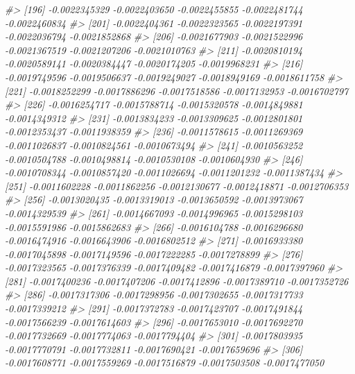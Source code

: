 \documentclass[
]{article}
\newenvironment{Shaded}{\begin{snugshade}}{\end{snugshade}}
\newcommand{\CommentTok}[1]{\textcolor[rgb]{0.56,0.35,0.01}{\textit{#1}}}
\begin{document}
\begin{Shaded}
\begin{Highlighting}[]
\CommentTok{\#\textgreater{} [196] {-}0.0022345329 {-}0.0022403650 {-}0.0022455855 {-}0.0022481744 {-}0.0022460834}
\CommentTok{\#\textgreater{} [201] {-}0.0022404361 {-}0.0022323565 {-}0.0022197391 {-}0.0022036794 {-}0.0021852868}
\CommentTok{\#\textgreater{} [206] {-}0.0021677903 {-}0.0021522996 {-}0.0021367519 {-}0.0021207206 {-}0.0021010763}
\CommentTok{\#\textgreater{} [211] {-}0.0020810194 {-}0.0020589141 {-}0.0020384447 {-}0.0020174205 {-}0.0019968231}
\CommentTok{\#\textgreater{} [216] {-}0.0019749596 {-}0.0019506637 {-}0.0019249027 {-}0.0018949169 {-}0.0018611758}
\CommentTok{\#\textgreater{} [221] {-}0.0018252299 {-}0.0017886296 {-}0.0017518586 {-}0.0017132953 {-}0.0016702797}
\CommentTok{\#\textgreater{} [226] {-}0.0016254717 {-}0.0015788714 {-}0.0015320578 {-}0.0014849881 {-}0.0014349312}
\CommentTok{\#\textgreater{} [231] {-}0.0013834233 {-}0.0013309625 {-}0.0012801801 {-}0.0012353437 {-}0.0011938359}
\CommentTok{\#\textgreater{} [236] {-}0.0011578615 {-}0.0011269369 {-}0.0011026837 {-}0.0010824561 {-}0.0010673494}
\CommentTok{\#\textgreater{} [241] {-}0.0010563252 {-}0.0010504788 {-}0.0010498814 {-}0.0010530108 {-}0.0010604930}
\CommentTok{\#\textgreater{} [246] {-}0.0010708344 {-}0.0010857420 {-}0.0011026694 {-}0.0011201232 {-}0.0011387434}
\CommentTok{\#\textgreater{} [251] {-}0.0011602228 {-}0.0011862256 {-}0.0012130677 {-}0.0012418871 {-}0.0012706353}
\CommentTok{\#\textgreater{} [256] {-}0.0013020435 {-}0.0013319013 {-}0.0013650592 {-}0.0013973067 {-}0.0014329539}
\CommentTok{\#\textgreater{} [261] {-}0.0014667093 {-}0.0014996965 {-}0.0015298103 {-}0.0015591986 {-}0.0015862683}
\CommentTok{\#\textgreater{} [266] {-}0.0016104788 {-}0.0016296680 {-}0.0016474916 {-}0.0016643906 {-}0.0016802512}
\CommentTok{\#\textgreater{} [271] {-}0.0016933380 {-}0.0017045898 {-}0.0017149596 {-}0.0017222285 {-}0.0017278899}
\CommentTok{\#\textgreater{} [276] {-}0.0017323565 {-}0.0017376339 {-}0.0017409482 {-}0.0017416879 {-}0.0017397960}
\CommentTok{\#\textgreater{} [281] {-}0.0017400236 {-}0.0017407206 {-}0.0017412896 {-}0.0017389710 {-}0.0017352726}
\CommentTok{\#\textgreater{} [286] {-}0.0017317306 {-}0.0017298956 {-}0.0017302655 {-}0.0017317733 {-}0.0017339212}
\CommentTok{\#\textgreater{} [291] {-}0.0017372783 {-}0.0017423707 {-}0.0017491844 {-}0.0017566239 {-}0.0017614603}
\CommentTok{\#\textgreater{} [296] {-}0.0017653010 {-}0.0017692270 {-}0.0017732669 {-}0.0017774063 {-}0.0017794404}
\CommentTok{\#\textgreater{} [301] {-}0.0017803935 {-}0.0017770791 {-}0.0017732811 {-}0.0017690421 {-}0.0017659696}
\CommentTok{\#\textgreater{} [306] {-}0.0017608771 {-}0.0017559269 {-}0.0017516879 {-}0.0017503508 {-}0.0017477050}

\end{Highlighting}
\end{Shaded}
\end{document}
